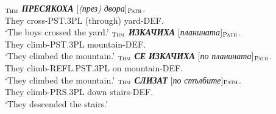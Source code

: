 \documentclass[output=paper,colorlinks,citecolor=brown]{langscibook}
\begin{document}
\begin{exe}
\ex  \label{ex:22}
\begin{xlist}
\ex  \label{ex:22:а}
\gll [\textit{Те}]$_{\text{\textsc{Thm}}}$ \textit{\textbf{ПРЕСЯКОХА}} [\textit{(през)} \textit{двора}]$_{\text{\textsc{Path}}}$. \\
They cross-PST.3PL (through) yard-DEF. \\
\glt `The boys crossed the yard.'
\ex\label{ex:22:b}
\gll [\textit{Те}]$_{\text{\textsc{Thm}}}$ \textit{\textbf{ИЗКАЧИХА}} [\textit{планината}]$_{\text{\textsc{Path}}}$. \\
They climb-PST.3PL mountain-DEF. \\
\glt `They climbed the mountain.'
\ex \label{ex:22:c}
\gll [\textit{Те}]$_{\text{\textsc{Thm}}}$ {\textit{\textbf{СЕ}} \textit{\textbf{ИЗКАЧИХА}}} [\textit{по} \textit{планината}]$_{\text{\textsc{Path}}}$. \\
They climb-REFL.PST.3PL on mountain-DEF. \\
\glt `They climbed the mountain.'
\ex \label{ex:22:d}
\gll [\textit{Те}]$_{\text{\textsc{Thm}}}$ {\textit{\textbf{СЛИЗАТ}}} [\textit{по} \textit{стълбите}]$_{\text{\textsc{Path}}}$. \\
They climb-PRS.3PL down stairs-DEF. \\
\glt `They descended the stairs.'
\end{xlist}
\end{exe}



\end{document}
